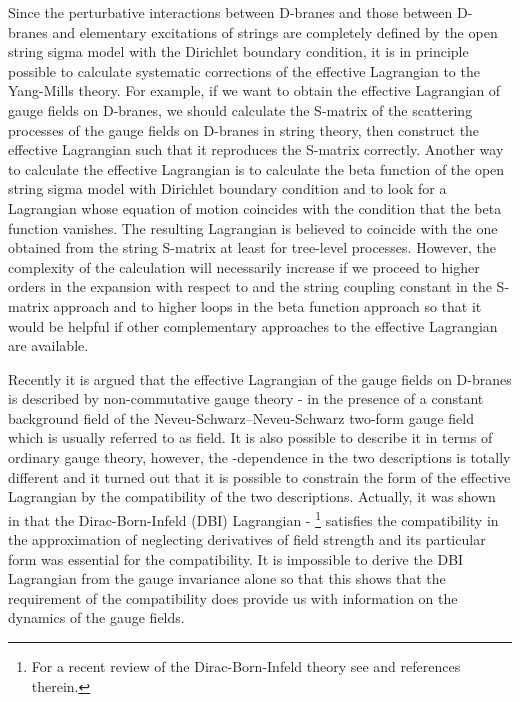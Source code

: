 \documentclass[a4paper,12pt]{article}
\begin{document}
Since the perturbative interactions between D-branes
and those between D-branes
and elementary excitations of strings
are completely defined
by the open string sigma model with the Dirichlet boundary condition,
it is in principle possible to calculate systematic corrections
of the effective Lagrangian
to the Yang-Mills theory.
For example, if we want to obtain the effective Lagrangian
of gauge fields on D-branes, we should calculate the S-matrix
of the scattering processes of the gauge fields
on D-branes in string theory,
then construct the effective Lagrangian such that it
reproduces the S-matrix correctly.
Another way to calculate the effective Lagrangian
is to calculate the beta function of the open string sigma model
with Dirichlet boundary condition
and to look for a Lagrangian whose equation of motion coincides
with the condition that the beta function vanishes.
The resulting Lagrangian is believed to coincide with
the one obtained from the string S-matrix
at least for tree-level processes.
However, the complexity of the calculation will necessarily increase
if we proceed to higher orders in the expansion with respect to
\coordHE{} and the string coupling constant \coordHE{}
in the S-matrix approach
and to higher loops in the beta function approach
so that it would be helpful if other complementary approaches
to the effective Lagrangian are available.

Recently it is argued that
the effective Lagrangian of the gauge fields on D-branes
is described by non-commutative gauge theory
\cite{CDS}-\cite{Schomerus}
in the presence of a constant background field
of the Neveu-Schwarz--Neveu-Schwarz
two-form gauge field which is usually referred to as \coordHE{} field.
It is also possible to describe it in terms of ordinary gauge theory,
however, the \coordHE{}-dependence in the two descriptions
is totally different
and it turned out that it is possible to constrain
the form of the effective Lagrangian
by the compatibility of the two descriptions.
Actually, it was shown in \cite{SW} that
the Dirac-Born-Infeld (DBI)
Lagrangian \cite{FT}-\cite{ACNY}
\footnote{
For a recent review of the Dirac-Born-Infeld theory
see \cite{Tseytlin} and references therein.}
satisfies the compatibility
in the approximation of neglecting derivatives of field strength
and its particular form was essential for the compatibility.
It is impossible to derive the DBI Lagrangian from
the gauge invariance alone so that
this shows that the requirement of the compatibility
does provide us with information on the dynamics of the gauge fields.
\end{document}
